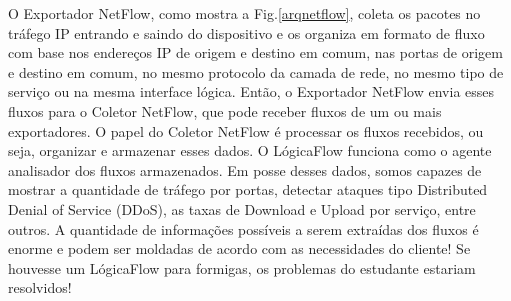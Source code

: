 \documentclass[twocolumn, letterpaper]{scrartcl}
\begin{document}
O Exportador NetFlow, como mostra a Fig.\ref{arqnetflow}, coleta os pacotes no tráfego IP entrando e saindo do dispositivo e os organiza em formato de fluxo com base nos endereços IP de origem e destino em comum, nas portas de origem e destino em comum, no mesmo protocolo da camada de rede, no mesmo tipo de serviço ou na mesma interface lógica. Então, o Exportador NetFlow envia esses fluxos para o Coletor NetFlow, que pode receber fluxos de um ou mais exportadores. O papel do Coletor NetFlow é processar os fluxos recebidos, ou seja, organizar e armazenar esses dados. O LógicaFlow funciona como o agente analisador dos fluxos armazenados. Em posse desses dados, somos capazes de mostrar a quantidade de tráfego por portas, detectar ataques tipo Distributed Denial of Service (DDoS), as taxas de Download e Upload por serviço, entre outros. A quantidade de informações possíveis a serem extraídas dos fluxos é enorme e podem ser moldadas de acordo com as necessidades do cliente! Se houvesse um LógicaFlow para formigas, os problemas do estudante estariam resolvidos!







	
    

    
    
    
    
	\blurb
\end{document}
